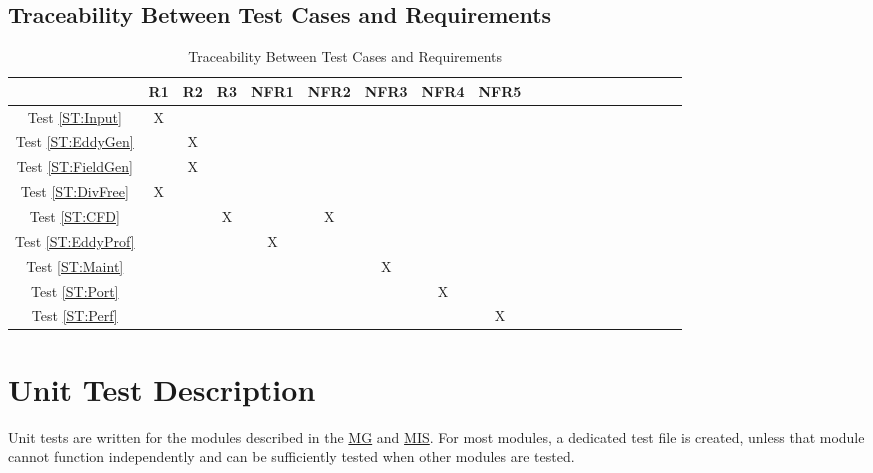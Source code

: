 \documentclass[12pt, titlepage]{article}
\begin{document}
\newpage
\subsection{Traceability Between Test Cases and Requirements}
\begin{table}[h!]
  \centering
  \begin{tabular}{|c|c|c|c|c|c|c|c|c|c|c|c|c|c|c|c|c|c|c|c|}
  \hline
                            & R1 & R2 & R3 & NFR1 & NFR2 & NFR3 & NFR4 & NFR5 \\
  \hline
  Test \ref{ST:Input}     & X  &    &    &      &      &      &      &      \\\hline
  Test \ref{ST:EddyGen}   &    & X  &    &      &      &      &      &      \\\hline
  Test \ref{ST:FieldGen}  &    & X  &    &      &      &      &      &      \\\hline
  Test \ref{ST:DivFree}   & X  &    &    &      &      &      &      &      \\\hline
  Test \ref{ST:CFD}       &    &    & X  &      & X    &      &      &      \\\hline
  Test \ref{ST:EddyProf}  &    &    &    & X    &      &      &      &      \\\hline
  Test \ref{ST:Maint}     &    &    &    &      &      & X    &      &      \\\hline
  Test \ref{ST:Port}      &    &    &    &      &      &      & X    &      \\\hline
  Test \ref{ST:Perf}      &    &    &    &      &      &      &      & X    \\\hline
  \end{tabular}
  \caption{Traceability Between Test Cases and Requirements}
  \label{Table:A_trace}
\end{table}


\section{Unit Test Description}

Unit tests are written for the modules described in the \href{https://github.com/omltcat/turbulent-flow/blob/main/docs/Design/SoftArchitecture/MG.pdf}{MG} and \href{https://github.com/omltcat/turbulent-flow/blob/main/docs/Design/SoftDetailedDes/MIS.pdf}{MIS}. For most modules, a dedicated test file is created, unless that module cannot function independently and can be sufficiently tested when other modules are tested.
\end{document}
